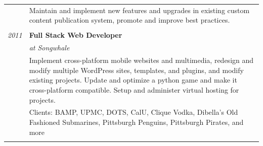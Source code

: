 \documentclass[]{article}
\begin{document}
\begin{multicols}{2}
\begin{longtable}[c]{@{}ll@{}}
\begin{minipage}[t]{0.20\columnwidth}
\strut\end{minipage} &
\begin{minipage}[t]{0.74\columnwidth}\raggedright\strut
\color{grey} Maintain and implement new features and upgrades in
existing custom content publication system, promote and improve best
practices.
\strut\end{minipage}\tabularnewline
\begin{minipage}[t]{0.20\columnwidth}\raggedright\strut
\strut\end{minipage} &
\begin{minipage}[t]{0.74\columnwidth}\raggedright\strut
\strut\end{minipage}\tabularnewline
\begin{minipage}[t]{0.20\columnwidth}\raggedright\strut
\color{grey} \emph{2011}
\strut\end{minipage} &
\begin{minipage}[t]{0.74\columnwidth}\raggedright\strut
\textbf{Full Stack Web Developer}
\strut\end{minipage}\tabularnewline
\begin{minipage}[t]{0.20\columnwidth}\raggedright\strut
\strut\end{minipage} &
\begin{minipage}[t]{0.74\columnwidth}\raggedright\strut
\emph{at Songwhale}
\strut\end{minipage}\tabularnewline
\begin{minipage}[t]{0.20\columnwidth}\raggedright\strut
\strut\end{minipage} &
\begin{minipage}[t]{0.74\columnwidth}\raggedright\strut
\color{grey} Implement cross-platform mobile websites and multimedia,
redesign and modify multiple WordPress sites, templates, and plugins,
and modify existing projects. Update and optimize a python game and make
it cross-platform compatible. Setup and administer virtual hosting for
projects.
\strut\end{minipage}\tabularnewline
\begin{minipage}[t]{0.20\columnwidth}\raggedright\strut
\strut\end{minipage} &
\begin{minipage}[t]{0.74\columnwidth}\raggedright\strut
Clients: BAMP, UPMC, DOTS, CalU, Clique Vodka, Dibella's Old Fashioned
Submarines, Pittsburgh Penguins, Pittsburgh Pirates, and more
\strut\end{minipage}\tabularnewline
\begin{minipage}[t]{0.20\columnwidth}\raggedright\strut

\end{minipage}
\end{longtable}
\end{multicols}
\end{document}
